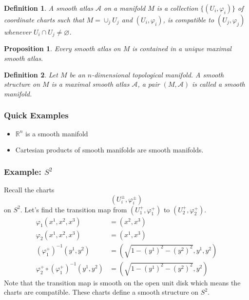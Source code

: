 \documentclass[a4paper]{article}
\newtheorem*{prop}{Proposition}
\newtheorem*{defn}{Definition}
\begin{document}
\begin{defn}
A smooth atlas $\mathcal{A}$ on a manifold $M$ is a collection $\{(U_i, \varphi_i)\}$ of coordinate charts such that $M = \cup_j U_j$ and $(U_i, \varphi_i)$, is compatible to $(U_j, \varphi_j)$ whenever $U_i \cap U_j \neq \varnothing$. 
\end{defn}

\begin{prop}
Every smooth atlas on $M$ is contained in a unique maximal smooth atlas. 
\end{prop}

\begin{defn}
Let $M$ be an $n$-dimensional topological manifold. A smooth structure on $M$ is a maximal smooth atlas $\mathcal{A}$, a pair $(M, \mathcal{A})$ is called a smooth manifold.
\end{defn}
 
\subsubsection*{Quick Examples}
\begin{itemize}
    \item $\mathds{R}^n$ is a smooth manifold
    \item Cartesian products of smooth manifolds are smooth manifolds.
\end{itemize}

\subsubsection*{Example: $S^2$}
Recall the charts
\[
    (U_i^\pm, \varphi_i^\pm)
\]
on $S^2$. Let's find the transition map from $(U_1^+, \varphi_1^+)$ to $(U_2^+, \varphi_2^+)$.
\[
    \begin{aligned}
        \varphi_1(x^1,x^2,x^3) &= (x^2, x^3) \\
        \varphi_2(x^1,x^2,x^3) &= (x^1, x^3) \\
        (\varphi_1^+)^{-1}(y^1, y^2) &= (\sqrt{1 - (y^1)^2 - (y^2)^2}, y^1, y^2) \\
        \varphi_2^+ \circ (\varphi_1^+)^{-1}(y^1, y^2) &= (\sqrt{1 - (y^1)^2 - (y^2)^2}, y^2)
    \end{aligned}
\]
Note that the transition map is smooth on the open unit disk which means the charts are compatible. These charts define a smooth structure on $S^2$.
\end{document}
